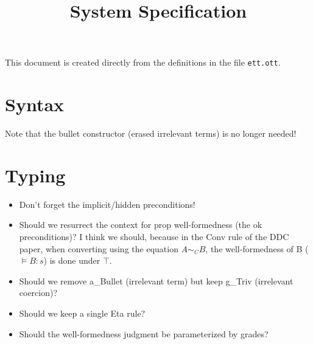 \documentclass{article}
\title{System Specification}
\begin{document}
\maketitle

This document is created directly from the definitions in the file
{\texttt{ett.ott}}.

\section{Syntax}
\ottgrammartabular{
\otttm\ottinterrule
\ottcontext\ottafterlastrule
}
Note that the bullet constructor (erased irrelevant terms) is no longer needed!

\section{Typing}
\begin{itemize}
\item Don't forget the implicit/hidden preconditions!
\end{itemize}
\begin{itemize}
\item Should we resurrect the context for prop well-formedness (the ok
  preconditions)? I think we should, because in the Conv rule of the
  DDC paper, when converting using the equation $A \sim_C B$, the
  well-formedness of B ($\vDash B : s$) is done under $\top$.
\end{itemize}
\begin{itemize}
\item Should we remove a\_Bullet (irrelevant term) but keep g\_Triv (irrelevant coercion)?
\item Should we keep a single Eta rule?
\end{itemize}
\begin{itemize}
\item Should the well-formedness judgment be parameterized by grades?
\end{itemize}
\end{document}
